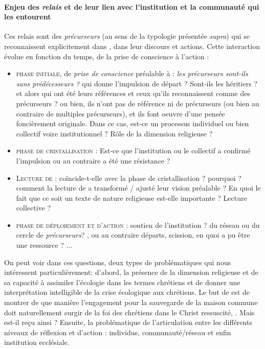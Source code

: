 \paragraph{Enjeu des \textit{relais} et de leur lien avec l'institution et la communauté qui les entourent} Ces relais sont des \textit{précurseurs} (au sens de la typologie présentée \textit{supra}) qui se reconnaissent explicitement dans \LS, dans leur discours et actions. 
Cette interaction évolue en fonction du temps, de la  prise de conscience à l'action :
\begin{itemize}
    \item \textsc{phase initiale}, de \textit{prise de conscience} préalable à \LS : \textit{les précurseurs sont-ils sans prédécesseurs ?}  qui donne l'impulsion de départ ? Sont-ils les héritiers ? et alors qui ont été leurs références et ceux qu'ils reconnaissent comme des précurseurs ? ou bien, ils n'ont pas de référence ni de précurseurs (ou bien au contraire de multiples précurseurs), et ils font oeuvre d'une pensée foncièrement originale. Dans ce cas, est-ce un processus individuel ou bien collectif voire institutionnel ? Rôle de la dimension religieuse ? 
    \item  \textsc{phase de cristallisation} : Est-ce que l'institution ou le collectif a confirmé l'impulsion ou au contraire a été une résistance  ? 
    \item \textsc{Lecture de \LS} : coïncide-t-elle avec la phase de cristallisation ? pourquoi ? comment la lecture de \LS a transformé / ajusté leur vision préalable ? En quoi le fait que ce soit un texte de nature religieuse est-elle importante ? Lecture collective ? 
   \item  \textsc{phase de déploiement et d'action}  : soutien de l'institution ? du réseau ou du cercle de \textit{précurseurs}? , ou au contraire départs, scission, en quoi \LS a pu être une ressource ? ...
\end{itemize}

On peut voir dans ces questions, deux types de problématiques qui nous intéressent particulièrement: 
d'abord, la présence de la dimension religieuse et de sa capacité à assimiler l'écologie dans les termes chrétiens et de donner une interprétation intelligible de la crise écologique aux chrétiens. Le but de \LS est de montrer de que manière l'engagement pour la sauvegarde de la maison commune doit naturellement surgir de la foi des chrétiens dans le Christ ressuscité, \cite{revol_reception_2017}. Mais est-il reçu ainsi ?
Ensuite, la problématique de l'articulation entre les différents niveaux de réflexion et d'action : individus, communauté/réseau et enfin institution ecclésiale. 




